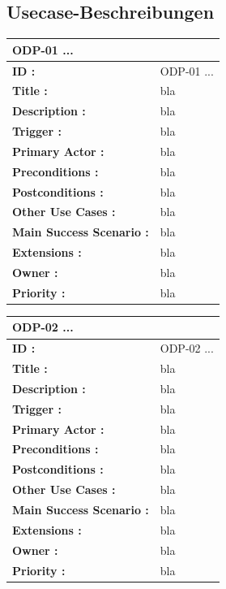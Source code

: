 	\subsection{Usecase-Beschreibungen}

	\begin{table}
		\begin{tabular}{|p{8cm}|p{8cm}|}
			\hline
			\textbf{ODP-01 ...} \\ 
			\hline
			\textbf{ID :}\centering & ODP-01 ... \\ \hline 
			\textbf{Title :}\centering & bla \\ \hline 
			\textbf{Description :}\centering & bla \\ \hline 
			\textbf{Trigger :}\centering & bla \\ \hline 
			\textbf{Primary Actor :} \centering & bla \\ \hline 
			\textbf{Preconditions :}\centering & bla \\ \hline 
			\textbf{Postconditions :}\centering & bla \\ \hline
			\textbf{Other Use Cases :}\centering & bla \\ \hline  
			\textbf{Main Success Scenario :}\centering & bla \\ \hline  
			\textbf{Extensions :}\centering & bla \\ \hline  
			\textbf{Owner :}\centering & bla \\ \hline  
			\textbf{Priority :}\centering & bla \\ \hline  
		\end{tabular}
	\end{table}
	
	\begin{table}
		\begin{tabular}{|p{8cm}|p{8cm}|}
			\hline
			\textbf{ODP-02 ...} \\ 				\hline
			\textbf{ID :}\centering & ODP-02 ... \\ \hline 
			\textbf{Title :}\centering & bla \\ \hline 
			\textbf{Description :}\centering & bla \\ \hline 
			\textbf{Trigger :}\centering & bla \\ \hline 
			\textbf{Primary Actor :} \centering & bla \\ \hline 
			\textbf{Preconditions :}\centering & bla \\ \hline 
			\textbf{Postconditions :}\centering & bla \\ \hline
			\textbf{Other Use Cases :}\centering & bla \\ \hline  
			\textbf{Main Success Scenario :}\centering & bla \\ \hline  
			\textbf{Extensions :}\centering & bla \\ \hline  
			\textbf{Owner :}\centering & bla \\ \hline  
			\textbf{Priority :}\centering & bla \\ \hline  
		\end{tabular}
	\end{table}
	

